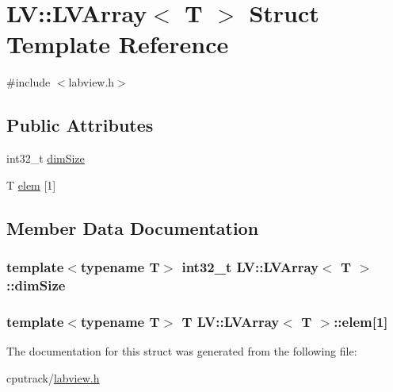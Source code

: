 \hypertarget{struct_l_v_1_1_l_v_array}{}\section{LV\+:\+:L\+V\+Array$<$ T $>$ Struct Template Reference}
\label{struct_l_v_1_1_l_v_array}


{\ttfamily \#include $<$labview.\+h$>$}

\subsection*{Public Attributes}
\begin{DoxyCompactItemize}
\item 
int32\+\_\+t \hyperlink{struct_l_v_1_1_l_v_array_a9a14cf28ba761496a4d66a345590dfde}{dim\+Size}
\item 
T \hyperlink{struct_l_v_1_1_l_v_array_a4a1fca43656425a9603fb4c267e75284}{elem} \mbox{[}1\mbox{]}
\end{DoxyCompactItemize}


\subsection{Member Data Documentation}
\subsubsection[{\texorpdfstring{dim\+Size}{dimSize}}]{\setlength{\rightskip}{0pt plus 5cm}template$<$typename T$>$ int32\+\_\+t {\bf L\+V\+::\+L\+V\+Array}$<$ T $>$\+::dim\+Size}\hypertarget{struct_l_v_1_1_l_v_array_a9a14cf28ba761496a4d66a345590dfde}{}\label{struct_l_v_1_1_l_v_array_a9a14cf28ba761496a4d66a345590dfde}
\subsubsection[{\texorpdfstring{elem}{elem}}]{\setlength{\rightskip}{0pt plus 5cm}template$<$typename T$>$ T {\bf L\+V\+::\+L\+V\+Array}$<$ T $>$\+::elem\mbox{[}1\mbox{]}}\hypertarget{struct_l_v_1_1_l_v_array_a4a1fca43656425a9603fb4c267e75284}{}\label{struct_l_v_1_1_l_v_array_a4a1fca43656425a9603fb4c267e75284}


The documentation for this struct was generated from the following file\+:\begin{DoxyCompactItemize}
\item 
cputrack/\hyperlink{labview_8h}{labview.\+h}\end{DoxyCompactItemize}
